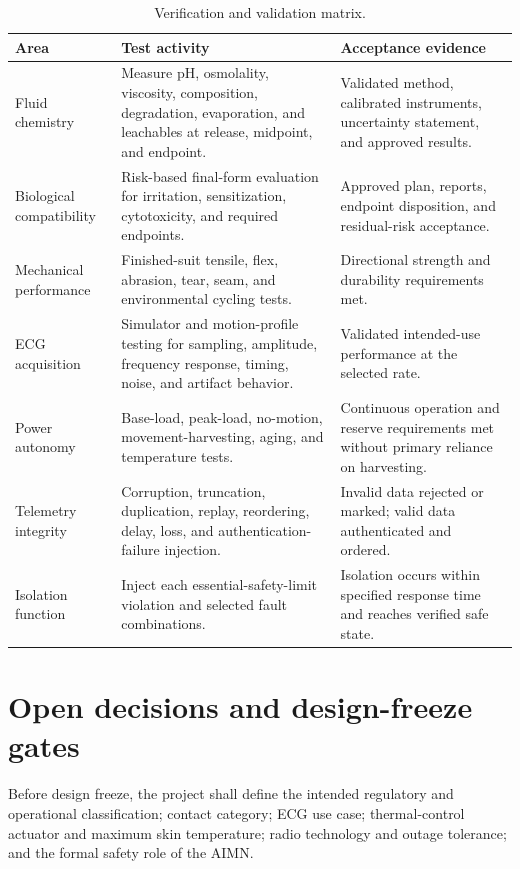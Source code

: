 \documentclass[11pt,a4paper]{article}
\begin{document}
\begin{longtable}{p{}p{}p{}}
\caption{Verification and validation matrix.}\label{tab:verification}\\
\toprule
\textbf{Area} & \textbf{Test activity} & \textbf{Acceptance evidence}\\
\midrule
Fluid chemistry & Measure pH, osmolality, viscosity, composition, degradation, evaporation, and leachables at release, midpoint, and endpoint. & Validated method, calibrated instruments, uncertainty statement, and approved results.\\
Biological compatibility & Risk-based final-form evaluation for irritation, sensitization, cytotoxicity, and required endpoints. & Approved plan, reports, endpoint disposition, and residual-risk acceptance.\\
Mechanical performance & Finished-suit tensile, flex, abrasion, tear, seam, and environmental cycling tests. & Directional strength and durability requirements met.\\
ECG acquisition & Simulator and motion-profile testing for sampling, amplitude, frequency response, timing, noise, and artifact behavior. & Validated intended-use performance at the selected rate.\\
Power autonomy & Base-load, peak-load, no-motion, movement-harvesting, aging, and temperature tests. & Continuous operation and reserve requirements met without primary reliance on harvesting.\\
Telemetry integrity & Corruption, truncation, duplication, replay, reordering, delay, loss, and authentication-failure injection. & Invalid data rejected or marked; valid data authenticated and ordered.\\
Isolation function & Inject each essential-safety-limit violation and selected fault combinations. & Isolation occurs within specified response time and reaches verified safe state.\\
\bottomrule
\end{longtable}

\section{Open decisions and design-freeze gates}\label{sec:open}
Before design freeze, the project shall define the intended regulatory and operational classification; contact category; ECG use case; thermal-control actuator and maximum skin temperature; radio technology and outage tolerance; and the formal safety role of the AIMN.
\end{document}
